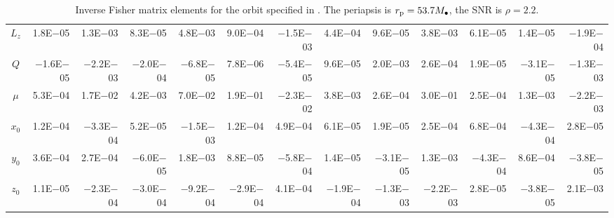 \begin{sidewaystable}[htbp]
\begin{tabular}{crrrrrrrrrrrr}
$L_z$ & 1.8E$-$05 & 1.3E$-$03 & 8.3E$-$05 & 4.8E$-$03 & 9.0E$-$04 & $-$1.5E$-$03 & 4.4E$-$04 & 9.6E$-$05 & 3.8E$-$03 & 6.1E$-$05 & 1.4E$-$05 & $-$1.9E$-$04 \\
$Q$ & $-$1.6E$-$05 & $-$2.2E$-$03 & $-$2.0E$-$04 & $-$6.8E$-$05 & 7.8E$-$06 & $-$5.4E$-$05 & 9.6E$-$05 & 2.0E$-$03 & 2.6E$-$04 & 1.9E$-$05 & $-$3.1E$-$05 & $-$1.3E$-$03 \\
$\mu$ & 5.3E$-$04 & 1.7E$-$02 & 4.2E$-$03 & 7.0E$-$02 & 1.9E$-$01 & $-$2.3E$-$02 & 3.8E$-$03 & 2.6E$-$04 & 3.0E$-$01 & 2.5E$-$04 & 1.3E$-$03 & $-$2.2E$-$03 \\
$x_0$ & 1.2E$-$04 & $-$3.3E$-$04 & 5.2E$-$05 & $-$1.5E$-$03 & 1.2E$-$04 & 4.9E$-$04 & 6.1E$-$05 & 1.9E$-$05 & 2.5E$-$04 & 6.8E$-$04 & $-$4.3E$-$04 & 2.8E$-$05 \\
$y_0$ & 3.6E$-$04 & 2.7E$-$04 & $-$6.0E$-$05 & 1.8E$-$03 & 8.8E$-$05 & $-$5.8E$-$04 & 1.4E$-$05 & $-$3.1E$-$05 & 1.3E$-$03 & $-$4.3E$-$04 & 8.6E$-$04 & $-$3.8E$-$05 \\
$z_0$ & 1.1E$-$05 & $-$2.3E$-$04 & $-$3.0E$-$04 & $-$9.2E$-$04 & $-$2.9E$-$04 & 4.1E$-$04 & $-$1.9E$-$04 & $-$1.3E$-$03 & $-$2.2E$-$03 & 2.8E$-$05 & $-$3.8E$-$05 & 2.1E$-$03 \\
\bottomrule
\end{tabular}
\caption{Inverse Fisher matrix elements for the orbit specified in . The periapsis is $r_\mathrm{p} = 53.7 M_\bullet$, the SNR is $\rho = 2.2$.}
\label{tab:Fisher_5}
\end{sidewaystable}
